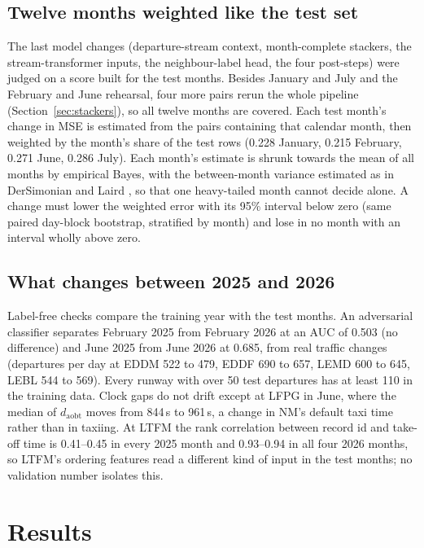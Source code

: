 \documentclass[
  manuscript=article,
  layout=preprint,
  year=2026,
  volume=x,
]{extra/joas}
\begin{document}
\subsection{Twelve months weighted like the test set}
\label{sec:twelve}

The last model changes (departure-stream context, month-complete stackers, the stream-transformer inputs, the neighbour-label head, the four post-steps) were judged on a score built for the test months. Besides
January and July and the February and June rehearsal, four more pairs rerun the whole pipeline (Section~\ref{sec:stackers}), so all twelve
months are covered. Each test month's change in MSE is estimated from the pairs containing that calendar month, then weighted by the
month's share of the test rows (0.228 January, 0.215 February, 0.271 June, 0.286 July). Each month's estimate is shrunk towards the mean
of all months by empirical Bayes, with the between-month variance estimated as in DerSimonian and Laird \cite{dersimonian1986meta}, so
that one heavy-tailed month cannot decide alone. A change must lower the weighted error with its 95\% interval below zero (same paired
day-block bootstrap, stratified by month) and lose in no month with an interval wholly above zero.

\subsection{What changes between 2025 and 2026}

Label-free checks compare the training year with the test months. An adversarial classifier separates February 2025 from February 2026
at an AUC of 0.503 (no difference) and June 2025 from June 2026 at 0.685, from real traffic changes (departures per day at EDDM 522 to
479, EDDF 690 to 657, LEMD 600 to 645, LEBL 544 to 569). Every runway with over 50 test departures has at least 110 in the training data.
Clock gaps do not drift except at LFPG in June, where the median of $d_{\mathrm{aobt}}$ moves from 844\,s to 961\,s, a change in NM's
default taxi time rather than in taxiing. At LTFM the rank correlation between record id and take-off time is 0.41--0.45 in every 2025
month and 0.93--0.94 in all four 2026 months, so LTFM's ordering features read a different kind of input in the test months; no
validation number isolates this.


\section{Results}
\label{sec:results}
\end{document}
